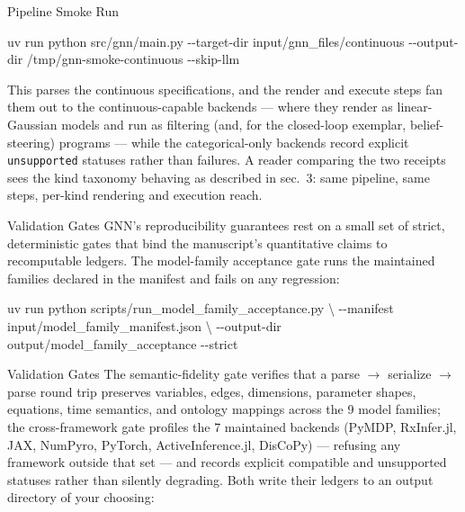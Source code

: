 \documentclass[
  ignorenonframetext,
]{beamer}
\newenvironment{Shaded}{}{}
\newcommand{\AttributeTok}[1]{\textcolor[rgb]{0.49,0.56,0.16}{#1}}
\newcommand{\DataTypeTok}[1]{\textcolor[rgb]{0.56,0.13,0.00}{#1}}
\newcommand{\ExtensionTok}[1]{#1}
\newcommand{\NormalTok}[1]{#1}
\begin{document}
\begin{frame}{Pipeline Smoke Run}
\begin{Shaded}
\begin{Highlighting}[]
\ExtensionTok{uv}\NormalTok{ run python src/gnn/main.py }\AttributeTok{{-}{-}target{-}dir}\NormalTok{ input/gnn\_files/continuous }\AttributeTok{{-}{-}output{-}dir}\NormalTok{ /tmp/gnn{-}smoke{-}continuous }\AttributeTok{{-}{-}skip{-}llm}
\end{Highlighting}
\end{Shaded}

This parses the continuous specifications, and the render and execute
steps fan them out to the continuous-capable backends --- where they
render as linear-Gaussian models and run as filtering (and, for the
closed-loop exemplar, belief-steering) programs --- while the
categorical-only backends record explicit \texttt{unsupported} statuses
rather than failures. A reader comparing the two receipts sees the kind
taxonomy behaving as described in sec.~3: same
pipeline, same steps, per-kind rendering and execution reach.
\end{frame}

\begin{frame}{Validation Gates}
\protect{}\label{validation-gates}
GNN's reproducibility guarantees rest on a small set of strict,
deterministic gates that bind the manuscript's quantitative claims to
recomputable ledgers. The model-family acceptance gate runs the
maintained families declared in the manifest and fails on any
regression:

\begin{Shaded}
\begin{Highlighting}[]
\ExtensionTok{uv}\NormalTok{ run python scripts/run\_model\_family\_acceptance.py }\DataTypeTok{\textbackslash{}}
  \AttributeTok{{-}{-}manifest}\NormalTok{ input/model\_family\_manifest.json }\DataTypeTok{\textbackslash{}}
  \AttributeTok{{-}{-}output{-}dir}\NormalTok{ output/model\_family\_acceptance }\AttributeTok{{-}{-}strict}
\end{Highlighting}
\end{Shaded}

\end{frame}

\begin{frame}{Validation Gates}
The semantic-fidelity gate verifies that a parse \texorpdfstring{\ensuremath{\to}}{->} serialize \texorpdfstring{\ensuremath{\to}}{->} parse
round trip preserves variables, edges, dimensions, parameter shapes,
equations, time semantics, and ontology mappings across the 9 model
families; the cross-framework gate profiles the 7 maintained backends
(PyMDP, RxInfer.jl, JAX, NumPyro, PyTorch, ActiveInference.jl, DisCoPy)
--- refusing any framework outside that set --- and records explicit
compatible and unsupported statuses rather than silently degrading. Both
write their ledgers to an output directory of your choosing:

\end{frame}
\end{document}
